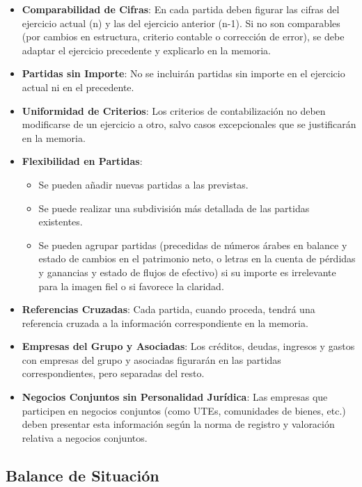 \documentclass[
  paper=a4,
  ,captions=tableheading
]{scrbook}
\providecommand{\tightlist}{%
  \setlength{\itemsep}{0pt}\setlength{\parskip}{0pt}}
\begin{document}
\begin{itemize}
\tightlist
\item
  \textbf{Comparabilidad de Cifras}: En cada partida deben figurar las
  cifras del ejercicio actual (n) y las del ejercicio anterior (n-1). Si
  no son comparables (por cambios en estructura, criterio contable o
  corrección de error), se debe adaptar el ejercicio precedente y
  explicarlo en la memoria.
\item
  \textbf{Partidas sin Importe}: No se incluirán partidas sin importe en
  el ejercicio actual ni en el precedente.
\item
  \textbf{Uniformidad de Criterios}: Los criterios de contabilización no
  deben modificarse de un ejercicio a otro, salvo casos excepcionales
  que se justificarán en la memoria.
\item
  \textbf{Flexibilidad en Partidas}:

  \begin{itemize}
  \tightlist
  \item
    Se pueden añadir nuevas partidas a las previstas.
  \item
    Se puede realizar una subdivisión más detallada de las partidas
    existentes.
  \item
    Se pueden agrupar partidas (precedidas de números árabes en balance
    y estado de cambios en el patrimonio neto, o letras en la cuenta de
    pérdidas y ganancias y estado de flujos de efectivo) si su importe
    es irrelevante para la imagen fiel o si favorece la claridad.
  \end{itemize}
\item
  \textbf{Referencias Cruzadas}: Cada partida, cuando proceda, tendrá
  una referencia cruzada a la información correspondiente en la memoria.
\item
  \textbf{Empresas del Grupo y Asociadas}: Los créditos, deudas,
  ingresos y gastos con empresas del grupo y asociadas figurarán en las
  partidas correspondientes, pero separadas del resto.
\item
  \textbf{Negocios Conjuntos sin Personalidad Jurídica}: Las empresas
  que participen en negocios conjuntos (como UTEs, comunidades de
  bienes, etc.) deben presentar esta información según la norma de
  registro y valoración relativa a negocios conjuntos.
\end{itemize}

\hypertarget{balance-de-situaciuxf3n}{%
\subsection{Balance de Situación}\label{balance-de-situaciuxf3n}}
\end{document}
